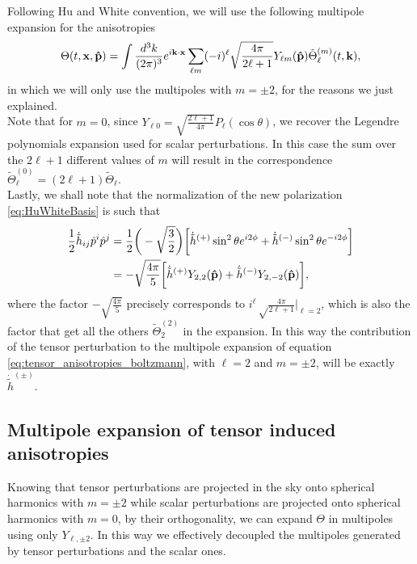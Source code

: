 Following Hu and White \cite{HuWhite} convention, we will use the following multipole expansion for the anisotropies
\begin{equation}
    \label{eq:TensorMultipoleExpansion}
    \Theta(t,\mathbf x,\mathbf{\hat{p}})=\int\frac{d^3k}{(2\pi)^3}e^{i\mathbf{k}\cdot\mathbf{x}}\sum_{\ell m} (-i)^{\ell}\sqrt{\frac{4\pi}{2\ell+1}}Y_{\ell m}(\mathbf{\hat{p}})\tilde\Theta_{\ell}^{(m)}(t,\mathbf k) ,
\end{equation}
in which we will only use the multipoles with $m=\pm2$, for the reasons we just explained.\\ Note that for $m=0$, since $Y_{\ell 0}=\sqrt{\frac{2\ell+1}{4\pi}}P_\ell(\cos\theta)$, we recover the Legendre polynomials expansion used for scalar perturbations. In this case the sum over the $2\ell+1$ different values of $m$ will result in the correspondence $\tilde \Theta_\ell^{(0)}=(2\ell+1)\tilde\Theta_{\ell}$.\\Lastly, we shall note that the normalization of the new polarization \eqref{eq:HuWhiteBasis} is such that 
\begin{align*}
    \frac{1}{2}\dot{\tilde{h}}_{ij}\hat p^i\hat p^j&=\frac{1}{2}\bigg(-\sqrt{\frac{3}{2}}\bigg)\bigg[\dot{\tilde{h}}^{(+)}\sin^2\theta e^{i2\phi}+\dot{\tilde{h}}^{(-)}\sin^2\theta e^{-i2\phi}\bigg]\\&=-\sqrt{\frac{4\pi}{5}}\bigg[\dot{\tilde{h}}^{(+)}Y_{2,2}(\mathbf{\hat{p}})+\dot{\tilde{h}}^{(-)}Y_{2,-2}(\mathbf{\hat{p}})\bigg],\\
\end{align*}
where the factor $-\sqrt{\frac{4\pi}{5}}$ precisely corresponds to $i^\ell\sqrt\frac{4\pi}{2\ell+1}|_{\ell=2}$, which is also the factor that get all the others $\tilde\Theta_2^{(2)}$ in the expansion. In this way the contribution of the tensor perturbation to the multipole expansion of equation \eqref{eq:tensor_anisotropies_boltzmann}, with $\ell=2$ and $m=\pm2$, will be exactly $\dot{\tilde{h}}^{(\pm)}$.
\subsection{Multipole expansion of tensor induced anisotropies}
Knowing that tensor perturbations are projected in the sky onto spherical harmonics with $m=\pm2$ while scalar perturbations are projected onto spherical harmonics with $m=0$, by their orthogonality, we can expand $\Theta$ in multipoles using only $Y_{\ell,\pm2}$. In this way we effectively decoupled the multipoles generated by tensor perturbations and the scalar ones.


